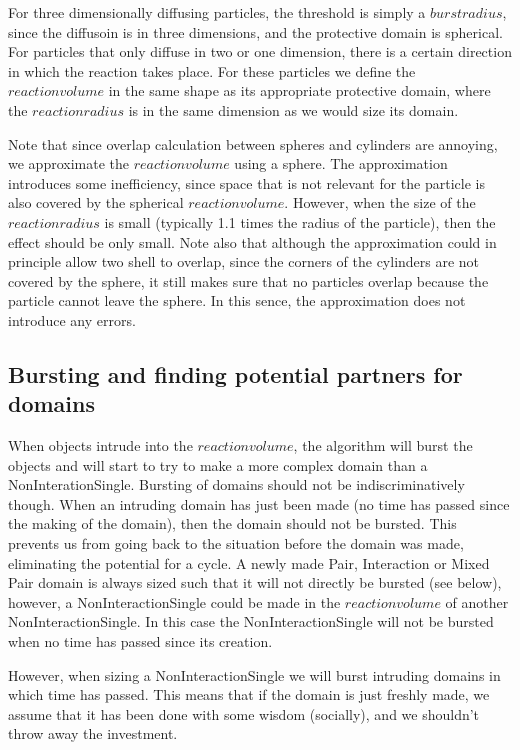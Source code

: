\documentclass[a4paper,11pt]{article}
\begin{document}
For three dimensionally diffusing particles, the threshold is simply a $burst radius$, since the diffusoin is in three
dimensions, and the protective domain is spherical.
For particles that only diffuse in two or one dimension, there is a certain direction in which the reaction takes place.
For these particles we define the $reaction volume$ in the same shape as its appropriate protective domain, where the
$reaction radius$ is in the same dimension as we would size its domain.

Note that since overlap calculation between spheres and cylinders are annoying, we approximate the $reaction volume$ using
a sphere. The approximation introduces some inefficiency, since space that is not relevant for the particle is also covered
by the spherical $reaction volume$. However, when the size of the $reaction radius$ is small (typically 1.1 times the radius
of the particle), then the effect should be only small.
Note also that although the approximation could in principle allow two shell to overlap, since the corners of the cylinders
are not covered by the sphere, it still makes sure that no particles
overlap because the particle cannot leave the sphere. In this sence, the approximation does not introduce any errors.


\subsection{Bursting and finding potential partners for domains}
When objects intrude into the $reaction volume$, the algorithm will burst the objects and will start to try
to make a more complex domain than a NonInterationSingle. Bursting of domains should not be indiscriminatively though.
When an intruding domain has just been made (no time has passed since the making of the domain), then the domain should not
be bursted.
This prevents us from going back to the situation before the domain was made, eliminating the potential for a cycle. A newly
made Pair, Interaction or Mixed Pair domain is always sized such that it will not directly be bursted (see below),
however, a NonInteractionSingle could be made in the $reaction volume$ of another NonInteractionSingle. In this case the
NonInteractionSingle will not be bursted when no time has passed since its creation.

However, when sizing a NonInteractionSingle we will burst intruding domains in which time has passed. This means that if the
domain is just freshly made, we assume that it has been done with some wisdom (socially), and we shouldn't throw away the
investment.
\end{document}
